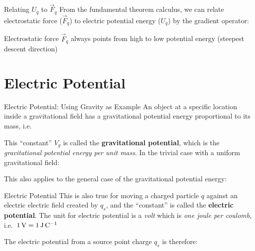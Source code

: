 \documentclass[12pt,aspectratio=169]{beamer}
\begin{document}
\begin{frame}{Relating $U_q$ to $\vec F_q$}
  From the fundamental theorem calculus, we can relate electrostatic force
  ($\vec F_q$) to electric potential energy ($U_q$) by the gradient operator:


  Electrostatic force $\vec F_q$ always points from high to low potential
  energy (steepest descent direction)
%    
\end{frame}



\section{Electric Potential}

\begin{frame}{Electric Potential: Using Gravity as Example}
  An object at a specific location inside a gravitational field has a
  gravitational potential energy proportional to its mass, i.e.\

  
  \vspace{-.1in}This ``constant'' $V_g$ is called the \textbf{gravitational
    potential}, which is the \emph{gravitational potential energy per unit
    mass}. In the trivial case with a uniform gravitational field:


  This also applies to the general case of the gravitational
  potential energy:
  
\end{frame}



\begin{frame}{Electric Potential}
  This is also true for moving a charged particle $q$ against an electric
  electric field created by $q_s$, and the ``constant'' is called the
  \textbf{electric potential}. The unit for electric potential is a \emph{volt}
  which is \emph{one joule per coulomb}, i.e.\
  $\SI1\volt=\SI1{\joule\per\coulomb}$


  The electric potential from a source point charge $q_s$ is therefore:

\end{frame}
\end{document}

